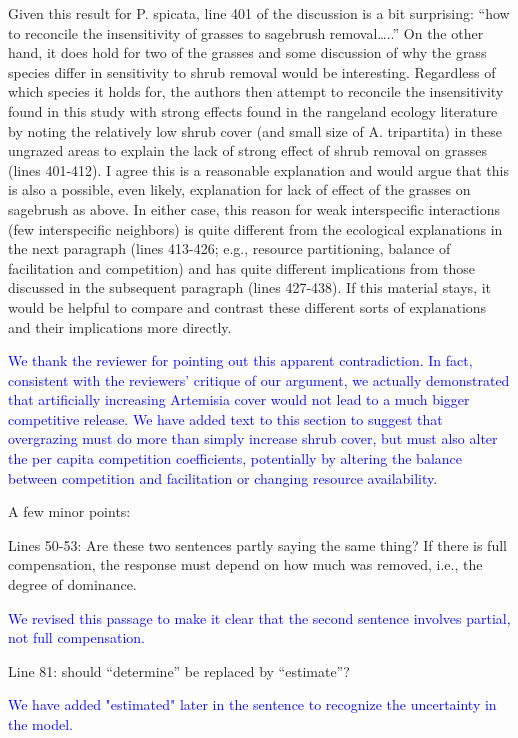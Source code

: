 \documentclass[12pt]{article}
\newcommand{\response}{\textcolor{blue}}
\begin{document}
Given this result for P. spicata, line 401 of the discussion is a bit surprising: “how to reconcile the
insensitivity of grasses to sagebrush removal…..” On the other hand, it does hold for two of the grasses
and some discussion of why the grass species differ in sensitivity to shrub removal would be interesting.
Regardless of which species it holds for, the authors then attempt to reconcile the insensitivity found in
this study with strong effects found in the rangeland ecology literature by noting the relatively low shrub
cover (and small size of A. tripartita) in these ungrazed areas to explain the lack of strong effect of shrub
removal on grasses (lines 401-412). I agree this is a reasonable explanation and would argue that this is
also a possible, even likely, explanation for lack of effect of the grasses on sagebrush as above. In either
case, this reason for weak interspecific interactions (few interspecific neighbors) is quite different from
the ecological explanations in the next paragraph (lines 413-426; e.g., resource partitioning, balance of
facilitation and competition) and has quite different implications from those discussed in the
subsequent paragraph (lines 427-438). If this material stays, it would be helpful to compare and
contrast these different sorts of explanations and their implications more directly.

\response{We thank the reviewer for pointing out this apparent contradiction. In fact, consistent with 
the reviewers' critique of our argument, we actually demonstrated that 
artificially increasing Artemisia cover would not lead to a much bigger competitive release. We have added text to this 
section to suggest that overgrazing must do more than simply increase shrub cover, but must also alter
the per capita competition coefficients, potentially by altering the balance between competition and facilitation
or changing resource availability. }

A few minor points:

Lines 50-53: Are these two sentences partly saying the same thing? If there is full compensation, the
response must depend on how much was removed, i.e., the degree of dominance.

\response{We revised this passage to make it clear that the second sentence involves partial, not full
compensation.}

Line 81: should “determine” be replaced by “estimate”?

\response{We have added "estimated" later in the sentence to recognize the uncertainty in the model.}
\end{document}
